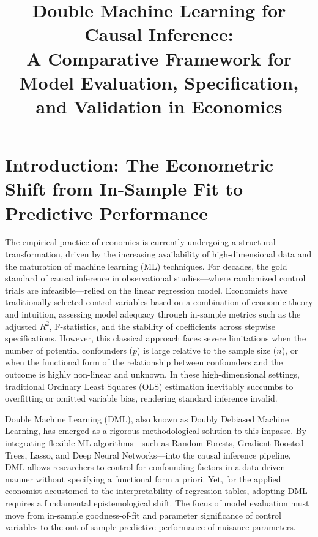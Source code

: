 \documentclass[12pt,a4paper]{article}
\title{Double Machine Learning for Causal Inference:\\
A Comparative Framework for Model Evaluation, Specification, and Validation in Economics}
\author{}
\date{}
\begin{document}
\maketitle

\section{Introduction: The Econometric Shift from In-Sample Fit to Predictive Performance}

The empirical practice of economics is currently undergoing a structural transformation, driven by the increasing availability of high-dimensional data and the maturation of machine learning (ML) techniques. For decades, the gold standard of causal inference in observational studies---where randomized control trials are infeasible---relied on the linear regression model. Economists have traditionally selected control variables based on a combination of economic theory and intuition, assessing model adequacy through in-sample metrics such as the adjusted $R^2$, F-statistics, and the stability of coefficients across stepwise specifications. However, this classical approach faces severe limitations when the number of potential confounders ($p$) is large relative to the sample size ($n$), or when the functional form of the relationship between confounders and the outcome is highly non-linear and unknown. In these high-dimensional settings, traditional Ordinary Least Squares (OLS) estimation inevitably succumbs to overfitting or omitted variable bias, rendering standard inference invalid.

Double Machine Learning (DML), also known as Doubly Debiased Machine Learning, has emerged as a rigorous methodological solution to this impasse. By integrating flexible ML algorithms---such as Random Forests, Gradient Boosted Trees, Lasso, and Deep Neural Networks---into the causal inference pipeline, DML allows researchers to control for confounding factors in a data-driven manner without specifying a functional form a priori. Yet, for the applied economist accustomed to the interpretability of regression tables, adopting DML requires a fundamental epistemological shift. The focus of model evaluation must move from in-sample goodness-of-fit and parameter significance of control variables to the out-of-sample predictive performance of nuisance parameters.
\end{document}
